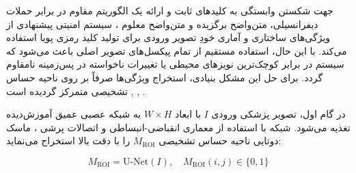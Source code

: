 




جهت شکستن وابستگی به کلیدهای ثابت و ارائه یک الگوریتم مقاوم در برابر حملات دیفرانسیلی، متن‌واضح برگزیده  و متن‌واضح معلوم ، سیستم امنیتی پیشنهادی از ویژگی‌های ساختاری و آماری خودِ تصویر ورودی برای تولید کلید رمزی پویا استفاده می‌کند. با این حال، استفاده مستقیم از تمام پیکسل‌های تصویر اصلی باعث می‌شود که سیستم در برابر کوچک‌ترین نویزهای محیطی یا تغییرات ناخواسته در پس‌زمینه نامقاوم گردد. برای حل این مشکل بنیادی، استخراج ویژگی‌ها صرفاً بر روی ناحیه حساس تشخیصی  متمرکز گردیده است , , .\par



در گام اول، تصویر پزشکی ورودی $I$ با ابعاد $W \times H$ به شبکه عصبی عمیق  آموزش‌دیده تغذیه می‌شود. شبکه  با استفاده از معماری انقباضی{-}انبساطی و اتصالات پرشی ، ماسک دوتایی ناحیه حساس تشخیصی $M_{\mathrm{ROI}}$ را با دقت بالا استخراج می‌نماید:\par



\[M_{\mathrm{ROI}} = \mathrm{U\text{-}Net}(I),\allowbreak{} \quad M_{\mathrm{ROI}}(i,\allowbreak{}j) \in \{0,\allowbreak{} 1\}\]\par




